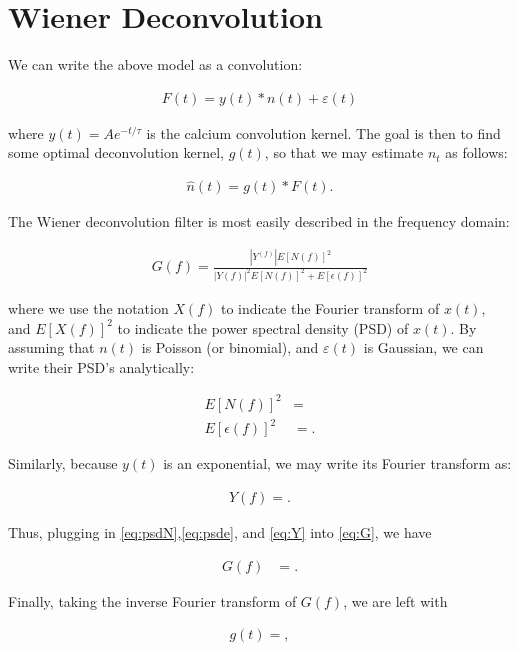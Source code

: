 \section{Wiener Deconvolution} \label{sec:wiener}

We can write the above model as a convolution:

\begin{align}
F(t) = y(t) \ast n(t) + \varepsilon(t)
\end{align}

\noindent where $y(t)=Ae^{-t/\tau}$ is the calcium convolution kernel. The goal is then to find some optimal deconvolution kernel, $g(t)$, so that we may estimate $n_t$ as follows:

\begin{align} \label{eq:opt_n}
\widehat{n}(t) = g(t) \ast F(t).
\end{align}

The Wiener deconvolution filter is most easily described in the frequency domain:

\begin{align} \label{eq:G}
G(f) = \frac{|Y^(f)| E[N(f)]^2}{|Y(f)|^2 E[N(f)]^2 + E[\epsilon(f)]^2}
\end{align}

\noindent where we use the notation $X(f)$ to indicate the Fourier transform of $x(t)$, and $E[X(f)]^2$ to indicate the power spectral density (PSD) of $x(t)$.  By assuming that $n(t)$ is Poisson (or binomial), and $\varepsilon(t)$ is Gaussian, we can write their PSD's analytically:

\begin{align} \label{eq:psdN}
E[N(f)]^2 &=\\ \label{eq:psde}
E[\epsilon(f)]^2&=.
\end{align}

Similarly, because $y(t)$ is an exponential, we may write its Fourier transform as:

\begin{align} \label{eq:Y}
Y(f)=.
\end{align}

Thus, plugging in \eqref{eq:psdN},\eqref{eq:psde}, and \eqref{eq:Y} into \eqref{eq:G}, we have

\begin{align}
G(f)&=.
\end{align}

Finally, taking the inverse Fourier transform of $G(f)$, we are left with

\begin{align}
g(t)=,
\end{align}


